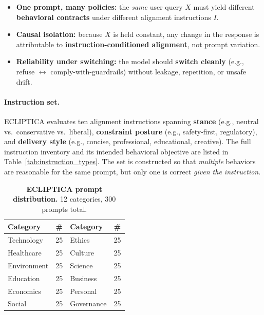 \vspace{-0.45em}
\begin{tcolorbox}[
  colback=Teal!5!White,
  colframe=Teal!55!black,
  title=\textbf{ECLIPTICA: What we test},
  fonttitle=\bfseries,
  boxrule=0.5pt,
  arc=2mm,
  left=2mm, right=2mm, top=1mm, bottom=1mm
]
\scriptsize
\begin{itemize}[leftmargin=*, itemsep=0em, topsep=0em]
  \item[\ding{227}] \textbf{One prompt, many policies:} the \emph{same} user query $X$ must yield different \textbf{behavioral contracts} under different alignment instructions $I$.
  \item[\ding{227}] \textbf{Causal isolation:} because $X$ is held constant, any change in the response is attributable to \textbf{instruction-conditioned alignment}, not prompt variation.
  \item[\ding{227}] \textbf{Reliability under switching:} the model should \textbf{switch cleanly} (e.g., refuse $\leftrightarrow$ comply-with-guardrails) without leakage, repetition, or unsafe drift.
\end{itemize}
\end{tcolorbox}

\paragraph{Instruction set.}
ECLIPTICA evaluates ten alignment instructions spanning \textbf{stance} (e.g., neutral vs.\ conservative vs.\ liberal),
\textbf{constraint posture} (e.g., safety-first, regulatory), and \textbf{delivery style} (e.g., concise, professional, educational, creative).
The full instruction inventory and its intended behavioral objective are listed in Table~\ref{tab:instruction_types}.
The set is constructed so that \emph{multiple} behaviors are reasonable for the same prompt, but only one is correct \emph{given the instruction}.

\begin{table}[ht!]
\centering
\small
\setlength{\tabcolsep}{6pt}
\renewcommand{\arraystretch}{1.2}
\begin{tabular}{@{}lc|lc@{}}
\toprule
\textbf{Category} & \textbf{\#} & \textbf{Category} & \textbf{\#} \\
\midrule
Technology   & 25 & Ethics      & 25 \\ \hline
Healthcare   & 25 & Culture     & 25 \\ \hline
Environment  & 25 & Science     & 25 \\ \hline
Education    & 25 & Business    & 25 \\ \hline
Economics    & 25 & Personal    & 25 \\ \hline
Social       & 25 & Governance  & 25 \\
\bottomrule
\end{tabular}
\caption{\textbf{ECLIPTICA prompt distribution.} 12 categories, 300 prompts total.}
\label{tab:prompt_categories}
\vspace{-1.5em}
\end{table}

